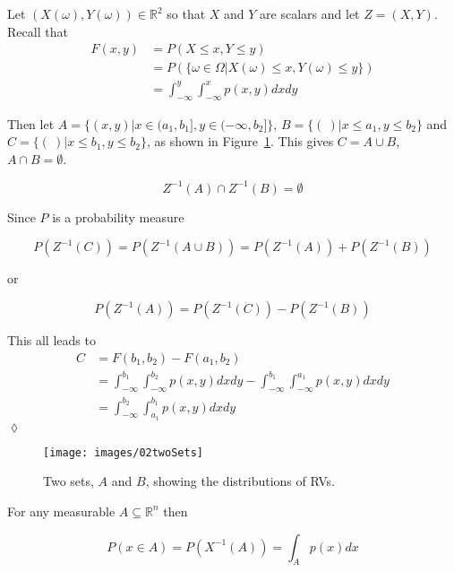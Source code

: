 \begin{example}
Let $(X(\omega),Y(\omega)) \in \mathbb{R}^2$ so that $X$ and $Y$ are scalars and let $Z=(X,Y)$.
Recall that
\begin{align*}
F(x,y) &= P(X\leq x, Y\leq y) \\
&= P(\lbrace \omega\in\Omega | X(\omega)\leq x, Y(\omega)\leq y\rbrace) \\
&= \int_{-\infty}^y\int_{-\infty}^x p(x,y)dxdy
\end{align*}

Then let $A=\lbrace(x,y) | x\in(a_1,b_1], y\in(-\infty,b_2]\rbrace$, $B=\lbrace(~) | x\leq a_1, y\leq b_2\rbrace$ and $C=\lbrace(~)|x\leq b_1, y\leq b_2\rbrace$, as shown in Figure~\ref{fig:02twoSets}.%
This gives $C=A\cup B$, $A\cap B=\emptyset$.

\begin{equation*}
Z^{-1}(A)\cap Z^{-1}(B) = \emptyset
\end{equation*}

Since $P$ is a probability measure

\begin{equation*}
P(Z^{-1}(C)) = P(Z^{-1}(A\cup B)) = P(Z^{-1}(A))+P(Z^{-1}(B))
\end{equation*}

or

\begin{equation*}
P(Z^{-1}(A))=P(Z^{-1}(C))-P(Z^{-1}(B))
\end{equation*}

This all leads to
\begin{align*}
C &= F(b_1,b_2) - F(a_1,b_2) \\
&= \int_{-\infty}^{b_1}\int_{-\infty}^{b_2} p(x,y)dxdy - \int_{-\infty}^{b_1}\int_{-\infty}^{a_1}p(x,y)dxdy \\
&= \int_{-\infty}^{b_2}\int_{a_1}^{b_1} p(x,y)dxdy
\end{align*}
$\lozenge$
\end{example}

\begin{figure}[ht!]
\centering
\texttt{[image: images/02twoSets]}
\caption{Two sets, $A$ and $B$, showing the distributions of RVs.}%
\label{fig:02twoSets}
\end{figure}

\begin{theorem}
For any measurable $A\subseteq\mathbb{R}^n$ then

\begin{equation*}
P(x\in A)=P(X^{-1}(A)) = \int_A p(x)dx
\end{equation*}

\end{theorem}

